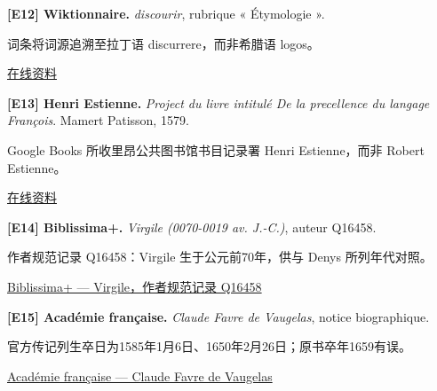 \par\noindent\begin{minipage}{\linewidth}
\label{ref-12}\noindent\textbf{[E12] Wiktionnaire.} \textit{discourir}, rubrique « Étymologie ».\par\nobreak
词条将词源追溯至拉丁语 discurrere，而非希腊语 logos。\par
{\small\href{https://fr.wiktionary.org/wiki/discourir}{在线资料}}\par
\par\end{minipage}\par

\par\noindent\begin{minipage}{\linewidth}
\label{ref-13}\noindent\textbf{[E13] Henri Estienne.} \textit{Project du livre intitulé De la precellence du langage François}. Mamert Patisson, 1579.\par\nobreak
Google Books 所收里昂公共图书馆书目记录署 Henri Estienne，而非 Robert Estienne。\par
{\small\href{https://books.google.es/books?id=5gkVrK527vYC}{在线资料}}\par
\par\end{minipage}\par

\par\noindent\begin{minipage}{\linewidth}
\label{ref-14}\noindent\textbf{[E14] Biblissima+.} \textit{Virgile (0070-0019 av. J.-C.)}, auteur Q16458.\par\nobreak
作者规范记录 Q16458：Virgile 生于公元前70年，供与 Denys 所列年代对照。\par
{\small\href{https://portail.biblissima.fr/fr/ark:/43093/pdataa05dbb0900f756522136441ae64be4b0d2e7de1b}{Biblissima+ — Virgile，作者规范记录 Q16458}}\par
\par\end{minipage}\par

\par\noindent\begin{minipage}{\linewidth}
\label{ref-15}\noindent\textbf{[E15] Académie française.} \textit{Claude Favre de Vaugelas}, notice biographique.\par\nobreak
官方传记列生卒日为1585年1月6日、1650年2月26日；原书卒年1659有误。\par
{\small\href{https://www.academie-francaise.fr/les-immortels/claude-favre-de-vaugelas}{Académie française — Claude Favre de Vaugelas}}\par
\par\end{minipage}\par

